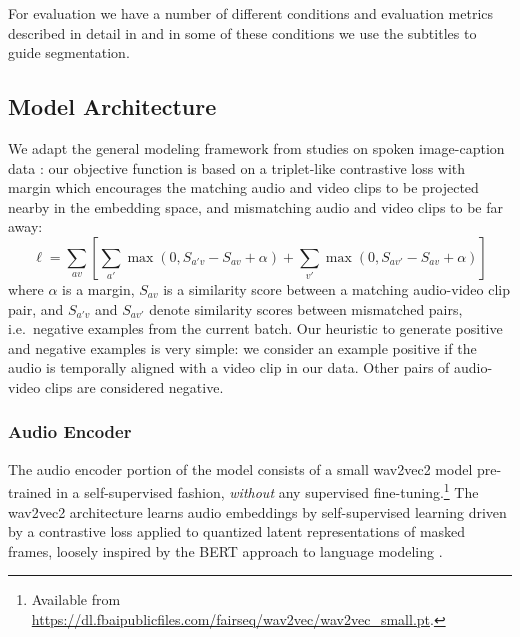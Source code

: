 For evaluation we have a number of different conditions and evaluation
metrics described in detail in  and in some of these
conditions we use the subtitles to guide
segmentation. 



\subsection{Model Architecture}
\label{sec:model}
We adapt the general modeling framework from studies on spoken
image-caption data
\citep{harwath2016unsupervised,chrupala-etal-2017-representations}:
our objective function is based on a triplet-like contrastive loss with margin which
encourages the matching audio and video clips to be projected nearby in
the embedding space, and mismatching audio and video clips to be far
away:
\begin{dmath}
  \ell = \sum_{av}\left[\sum_{a'} \max(0, S_{a'v} - S_{av} +
    \alpha) + \sum_{v'} \max(0, S_{av'} - S_{av} + \alpha) \right]
  \label{eq:triplet}
\end{dmath}
where $\alpha$ is a margin, $S_{av}$ is a similarity score between a
matching audio-video clip pair, and $S_{a'v}$ and $S_{av'}$ denote
similarity scores between mismatched pairs, i.e.\ negative examples
from the current batch. Our heuristic to generate positive and
negative examples is very simple: we consider an example
positive if the audio is temporally aligned with a video clip in our
data. Other pairs of audio-video clips are considered negative.

\subsubsection{Audio Encoder}
The audio encoder portion of the model consists of a {\sc small
  wav2vec2} model \citep{wav2vec2} pre-trained in a self-supervised
fashion, \emph{without} any supervised fine-tuning.\footnote{Available from
  \url{https://dl.fbaipublicfiles.com/fairseq/wav2vec/wav2vec_small.pt}.}
The {\sc wav2vec2} architecture learns audio embeddings by
self-supervised learning driven by a contrastive loss applied to 
quantized latent representations of masked frames, loosely inspired by
the BERT approach to language modeling \citep{devlin-etal-2019-bert}.


